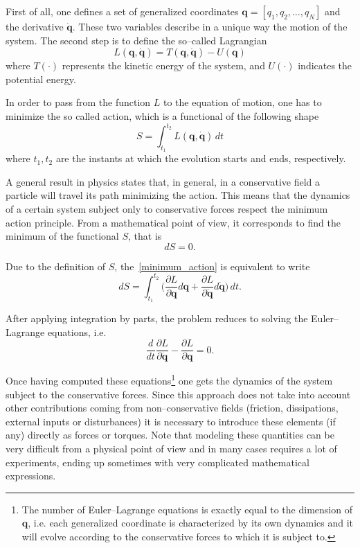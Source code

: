 \documentclass[11pt]{article}
\begin{document}
First of all, one defines a set of generalized coordinates $\bm{q} = [q_1, q_2, \dots, q_N]$ and the derivative $\dot{\bm{q}}$. These two variables describe in a unique way the motion of the system. The second step is to define the so--called Lagrangian
\begin{equation}
L(\bm{q},\dot{\bm{q}}) = T(\bm{q},\dot{\bm{q}}) - U(\bm{q})
\label{lagrangian}
\end{equation}
where $T(\cdot)$ represents the kinetic energy of the system, and $U(\cdot)$ indicates the potential energy.

In order to pass from the function $L$ to the equation of motion, one has to minimize the so called action, which is a functional of the following shape
\begin{equation}
S = \int_{t_1}^{t_2} L(\bm{q},\dot{\bm{q}}) \, dt
\label{action_functional}
\end{equation}
where $t_1, t_2$ are the instants at which the evolution starts and ends, respectively.

A general result in physics states that, in general, in a conservative field a particle will travel its path minimizing the action. This means that the dynamics of a certain system subject only to conservative forces respect the minimum action principle. From a mathematical point of view, it corresponds to find the minimum of the functional $S$, that is
\begin{equation}
dS = 0.
\label{minimum_action}
\end{equation}

Due to the definition of $S$, the~\eqref{minimum_action} is equivalent to write
\[
dS = \int_{t_1}^{t_2} \Biggl( \dfrac{\partial L}{\partial \bm{q}}d\bm{q} + \dfrac{\partial L}{\partial \dot{\bm{q}}}d\dot{\bm{q}}\Biggr) \, dt.
\]

After applying integration by parts, the problem reduces to solving the Euler--Lagrange equations, i.e.
\begin{equation}
\dfrac{d}{dt} \dfrac{\partial L}{\partial \dot{\bm{q}}} - \dfrac{\partial L}{\partial \bm{q}} = 0.
\label{euler_lagrange}
\end{equation}

Once having computed these equations\footnote{The number of Euler--Lagrange equations is exactly equal to the dimension of $\bm{q}$, i.e. each generalized coordinate is characterized by its own dynamics and it will evolve according to the conservative forces to which it is subject to.} one gets the dynamics of the system subject to the conservative forces. Since this approach does not take into account other contributions coming from non--conservative fields (friction, dissipations, external inputs or disturbances) it is necessary to introduce these elements (if any) directly as forces or torques. Note that modeling these quantities can be very difficult from a physical point of view and in many cases requires a lot of experiments, ending up sometimes with very complicated mathematical expressions.
\end{document}
